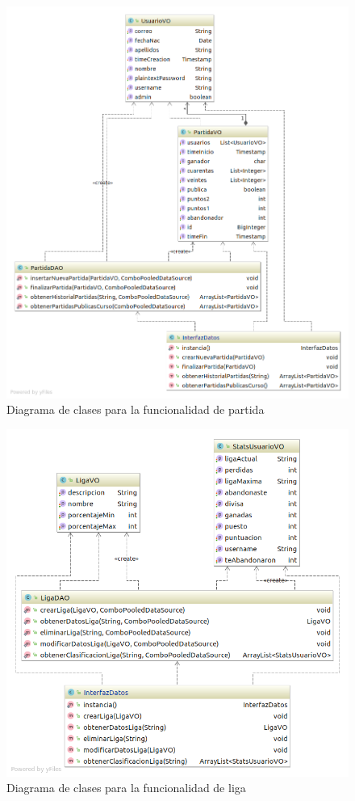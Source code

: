 \begin{figure}[H]
\centering
\includegraphics[scale = 0.5]{figuras/base_datos/clasesPartida.png}
\caption{Diagrama de clases para la funcionalidad de partida}
\label{fig:diagramaClasesPartida}
\end{figure}
\begin{figure}[H]
\centering
\includegraphics[scale = 0.5]{figuras/base_datos/clasesLiga.png}
\caption{Diagrama de clases para la funcionalidad de liga}
\label{fig:diagramaClasesLiga}
\end{figure}
